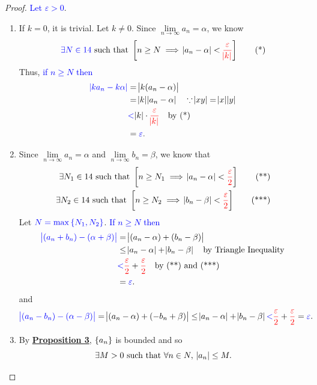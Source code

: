 \documentclass[11pt,openany]{article}
\begin{document}
\begin{note}[]
\begin{proof}
\newpage
\textcolor{blue}{Let $\varepsilon>0$}. \begin{enumerate}[(1)]
	\item If $k=0$, it is trivial. Let $k\neq 0$. Since $\lim\limits_{n\to\infty}a_n=\alpha$, we know \[
	\textcolor{blue}{\exists N\in\N}\ \text{such that}\ \left[n\geq N\implies\abs{a_n-\alpha}<\textcolor{red}{\frac{\varepsilon}{\abs{k}}}\right]\label{eq:eq1} \tag{*}
	\] Thus, \textcolor{blue}{if $n\geq N$ then} \begin{align*}
		\textcolor{blue}{\abs{ka_n-k\alpha}}&=\abs{k(a_n-\alpha)}\\
		&=\abs{k}\abs{a_n-\alpha}\quad\because \abs{xy}=\abs{x}\abs{y}\\
		&\textcolor{blue}{<}\abs{k}\cdot\textcolor{red}{\frac{\varepsilon}{\abs{k}}}\quad\text{by (*)}\\
		&=\textcolor{blue}{\varepsilon}.
	\end{align*}
	\item Since $\lim\limits_{n\to\infty}a_n=\alpha$ and $\lim\limits_{n\to\infty}b_n=\beta$, we know that \begin{align*}
		\exists N_1\in14\ \text{such that}\ \left[n\geq N_1\implies\abs{a_n-\alpha}<\textcolor{red}{\frac{\varepsilon}{2}}\right]\label{eq:eq2} \tag{**}\\
		\exists N_2\in14\ \text{such that}\ \left[n\geq N_2\implies\abs{b_n-\beta}<\textcolor{red}{\frac{\varepsilon}{2}}\right]\label{eq:eq3} \tag{***}
	\end{align*} Let $\textcolor{blue}{N=\max\set{N_1,N_2}}$. \textcolor{blue}{If $n\geq N$ then} \begin{align*}
		\textcolor{blue}{\abs{(a_n+ b_n)-(\alpha+ \beta)}}&=\abs{(a_n-\alpha)+(b_n-\beta)}\\
		&\leq\abs{a_n-\alpha}+\abs{b_n-\beta}\quad\text{by Triangle Inequality}\\
		&\textcolor{blue}{<}\textcolor{red}{\frac{\varepsilon}{2}}+\textcolor{red}{\frac{\varepsilon}{2}}\quad\text{by (**) and (***)}\\
		&=\textcolor{blue}{\varepsilon}.
	\end{align*} and \[
	\textcolor{blue}{\abs{(a_n- b_n)-(\alpha- \beta)}}=\abs{(a_n-\alpha)+(-b_n+\beta)}\leq\abs{a_n-\alpha}+\abs{b_n-\beta}\textcolor{blue}{<}\textcolor{red}{\frac{\varepsilon}{2}}+\textcolor{red}{\frac{\varepsilon}{2}}=\textcolor{blue}{\varepsilon}.
	\]
	\vfill
	\item  By \hyperlink{pro3}{\textbf{Proposition 3}}, $\set{a_n}$ is bounded and so \[
	\exists M>0\ \text{such that}\ \forall n\in N,\ \abs{a_n}\leq M.
\]
\end{enumerate}
\end{proof}
\end{note}
\end{document}
